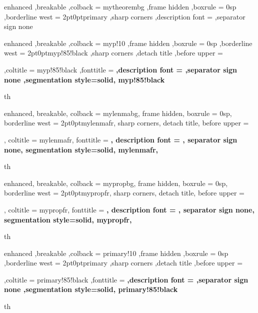 {%
    enhanced
    ,breakable
    ,colback = mytheorembg
    ,frame hidden
    ,boxrule = 0sp
    ,borderline west = {2pt}{0pt}{primary}
    ,sharp corners
    ,description font = \mdseries
    ,separator sign none
}

{%
    enhanced
    ,breakable
    ,colback = myp!10
    ,frame hidden
    ,boxrule = 0sp
    ,borderline west = {2pt}{0pt}{myp!85!black}
    ,sharp corners
    ,detach title
    ,before upper = \tcbtitle\par\smallskip
    ,coltitle = myp!85!black
    ,fonttitle = \bfseries\sffamily
    ,description font = \mdseries
    ,separator sign none
    ,segmentation style={solid, myp!85!black}
}
{th}



{%
    enhanced,
    breakable,
    colback = mylenmabg,
    frame hidden,
    boxrule = 0sp,
    borderline west = {2pt}{0pt}{mylenmafr},
    sharp corners,
    detach title,
    before upper = \tcbtitle\par\smallskip,
    coltitle = mylenmafr,
    fonttitle = \bfseries\sffamily,
    description font = \mdseries,
    separator sign none,
    segmentation style={solid, mylenmafr},
}
{th}


{%
    enhanced,
    breakable,
    colback = mypropbg,
    frame hidden,
    boxrule = 0sp,
    borderline west = {2pt}{0pt}{mypropfr},
    sharp corners,
    detach title,
    before upper = \tcbtitle\par\smallskip,
    coltitle = mypropfr,
    fonttitle = \bfseries\sffamily,
    description font = \mdseries,
    separator sign none,
    segmentation style={solid, mypropfr},
}
{th}



{%
    enhanced
    ,breakable
    ,colback = primary!10
    ,frame hidden
    ,boxrule = 0sp
    ,borderline west = {2pt}{0pt}{primary}
    ,sharp corners
    ,detach title
    ,before upper = \tcbtitle\par\smallskip
    ,coltitle = primary!85!black
    ,fonttitle = \bfseries\sffamily
    ,description font = \mdseries
    ,separator sign none
    ,segmentation style={solid, primary!85!black}
}
{th}

